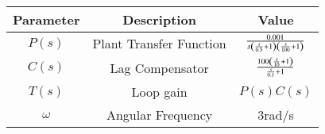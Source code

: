 \begin{tabular}{|c|c|c|}
\hline
    Parameter & Description & Value\\
    \hline
    $P(s)$ & Plant Transfer Function & $\frac{0.001}{s\left(\frac{s}{0.5}+1\right)\left(\frac{s}{100}+1\right)}$\\
    \hline
    $C(s)$ & Lag Compensator  & $\frac{100\left(\frac{s}{10}+1\right)}{\frac{s}{0.1}+1}$\\
    \hline
    $T(s)$ & Loop gain  & $P(s) C(s)$ \\
    \hline
    $\omega$ & Angular Frequency & 3rad/s \\
    \hline
\end{tabular}
